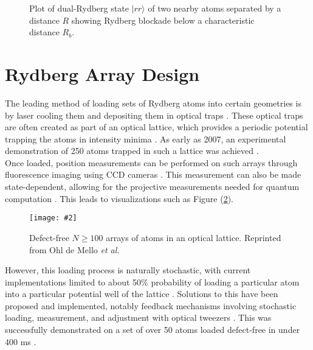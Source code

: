 \documentclass[aps,twocolumn,preprintnumbers]{revtex4}
\newcommand{\ket}[1]{|#1\rangle}
\newcommand{\img}[4][0.5\textwidth]{
  \begin{figure}[h]
    \centering
    \texttt{[image: \#2]}
    \caption{#3}
    \label{#4}
  \end{figure}
}
\begin{document}
\begin{figure}[h]
  \centering
  \caption{Plot of dual-Rydberg state $\ket{rr}$ of two nearby atoms separated by a distance $R$ showing Rydberg blockade below a characteristic distance $R_b$.}
  \label{fig:blockade}
\end{figure}

\section{Rydberg Array Design}

The leading method of loading sets of Rydberg atoms into certain geometries is by laser cooling them and depositing them in optical traps \cite{gates}. These optical traps are often created as part of an optical lattice, which provides a periodic potential trapping the atoms in intensity minima \cite{3d}. As early as 2007, an experimental demonstration of 250 atoms trapped in such a lattice was achieved \cite{3d}.\\
Once loaded, position measurements can be performed on such arrays through fluorescence imaging using CCD cameras \cite{3d}. This measurement can also be made state-dependent, allowing for the projective measurements needed for quantum computation \cite{proj}. This leads to visualizations such as Figure (\ref{fig:measure}).\\
\img{measure}{Defect-free $N\geq 100$ arrays of atoms in an optical lattice. Reprinted from Ohl de Mello \textit{et al.}}{fig:measure}
However, this loading process is naturally stochastic, with current implementations limited to about 50\% probability of loading a particular atom into a particular potential well of the lattice \cite{concise}. Solutions to this have been proposed and implemented, notably feedback mechanisms involving stochastic loading, measurement, and adjustment with optical tweezers \cite{loading}. This was successfully demonstrated on a set of over 50 atoms loaded defect-free in under 400 ms \cite{loading}.
\end{document}
